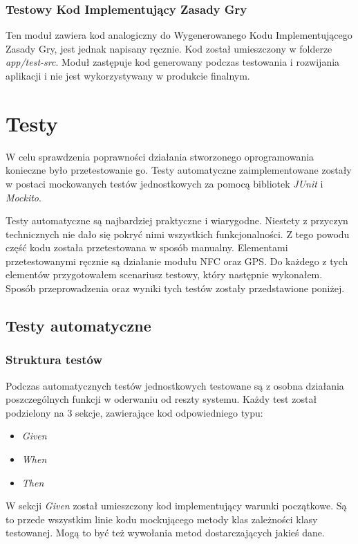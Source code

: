 \documentclass[openright]{xmgr}
\begin{document}
\subsection*{Testowy Kod Implementujący Zasady Gry}
Ten moduł zawiera kod analogiczny do Wygenerowanego Kodu Implementującego Zasady Gry, jest jednak napisany ręcznie. Kod został umieszczony w folderze \textit{app/test-src}. Moduł zastępuje kod generowany podczas testowania i rozwijania aplikacji i nie jest wykorzystywany w produkcie finalnym.

\chapter{Testy} 

W celu sprawdzenia poprawności działania stworzonego oprogramowania konieczne było przetestowanie go.  Testy automatyczne zaimplementowane zostały w postaci mockowanych testów jednostkowych za pomocą bibliotek \textit{JUnit} i \textit{Mockito}.

Testy automatyczne są najbardziej praktyczne i wiarygodne. Niestety z przyczyn technicznych nie dało się pokryć nimi wszystkich funkcjonalności. Z tego powodu część kodu została przetestowana w sposób manualny. Elementami przetestowanymi ręcznie są działanie modułu NFC oraz GPS. Do każdego z tych elementów przygotowałem scenariusz testowy, który następnie wykonałem. Sposób przeprowadzenia oraz wyniki tych testów zostały przedstawione poniżej.

\section{Testy automatyczne}
\subsection{Struktura testów}
Podczas  automatycznych testów jednostkowych testowane są z osobna działania poszczególnych funkcji w oderwaniu od reszty systemu. Każdy test został podzielony na 3 sekcje, zawierające kod odpowiedniego typu:
\begin{itemize}
\item \textit{Given}
\item \textit{When}
\item \textit{Then}
\end{itemize}

W sekcji \textit{Given} został umieszczony kod implementujący warunki początkowe. Są to przede wszystkim linie kodu mockującego metody klas zależności klasy testowanej. Mogą to być też wywołania metod dostarczających jakieś dane. 
\end{document}
